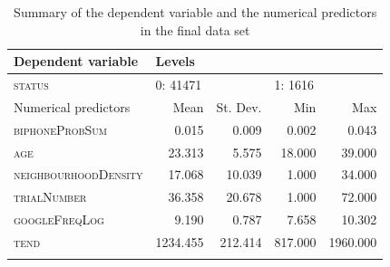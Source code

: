 \begin{table}\fontsize{10}{11}
\caption{Summary of the dependent variable and the numerical predictors in the final data set}
\label{tab:7.5}
\centering
\begin{tabular}{lrrrr} 
\lsptoprule
Dependent variable   & \multicolumn{4}{l}{Levels}                                      \\ 
\midrule
\textsc{status}               & \multicolumn{2}{l}{0:
  41471} & \multicolumn{2}{l}{1:
  1616}  \\ 
\midrule
Numerical predictors & Mean     & St. Dev.            & Min     & Max                  \\ 
\midrule
\textsc{biphoneProbSum}       & 0.015    & 0.009               & 0.002   & 0.043                \\
\textsc{age}                  & 23.313   & 5.575               & 18.000  & 39.000               \\
\textsc{neighbourhoodDensity} & 17.068   & 10.039              & 1.000   & 34.000               \\
\textsc{trialNumber}          & 36.358   & 20.678              & 1.000   & 72.000               \\
\textsc{googleFreqLog}        & 9.190    & 0.787               & 7.658   & 10.302               \\
\textsc{tend}                 & 1234.455 & 212.414             & 817.000 & 1960.000             \\
\lspbottomrule
\end{tabular}
\end{table}






